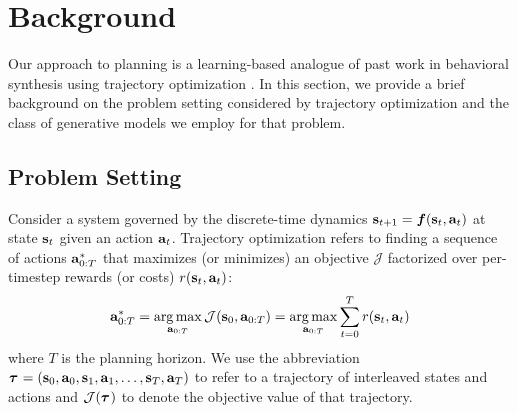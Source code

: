 \section{Background}
\label{sec:background}

Our approach to planning is a learning-based analogue of past work in behavioral synthesis using trajectory optimization \citep{witkin1988spacetime, tassa2012synthesis}.
In this section, we provide a brief background on the problem setting considered by trajectory optimization and the class of generative models we employ for that problem.

\subsection{Problem Setting}
\label{sec:background_traj_opt}
Consider a system governed by the discrete-time dynamics $\mathbf{s}_{t+1} = {\bm{f}}(\mathbf{s}_t, \mathbf{a}_t)$ at state $\mathbf{s}_t$ given an action $\mathbf{a}_t$.
Trajectory optimization refers to finding a sequence of actions $\mathbf{a}_{0:T}^*$ that maximizes (or minimizes) an objective $\mathcal{J}$ factorized over per-timestep rewards (or costs) $r(\mathbf{s}_t, \mathbf{a}_t)$:
\[
\mathbf{a}_{0:T}^* = \operatorname*{arg\,max}_{\mathbf{a}_{0:T}} \mathcal{J}(\mathbf{s}_0, \mathbf{a}_{0:T}) = \operatorname*{arg\,max}_{\mathbf{a}_{0:T}} \sum_{t=0}^{T} r(\mathbf{s}_t, \mathbf{a}_t)
\]
where $T$ is the planning horizon.
We use the abbreviation $\bm{\tau}^{} = (\mathbf{s}_0, \mathbf{a}_0, \mathbf{s}_1, \mathbf{a}_1, \ldots, \mathbf{s}_T, \mathbf{a}_T)$ to refer to a trajectory of interleaved states and actions and $\mathcal{J}(\bm{\tau}^{})$ to denote the objective value of that trajectory.


